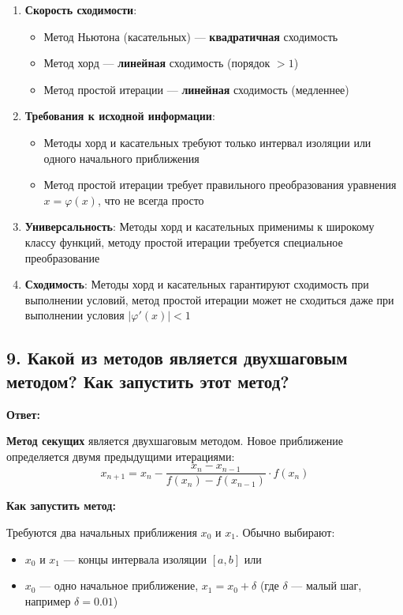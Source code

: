 \documentclass[a4paper,12pt]{article}
\begin{document}
\begin{enumerate}
    \item \textbf{Скорость сходимости}: 
    \begin{itemize}
        \item Метод Ньютона (касательных) --- \textbf{квадратичная} сходимость
        \item Метод хорд --- \textbf{линейная} сходимость (порядок $> 1$)
        \item Метод простой итерации --- \textbf{линейная} сходимость (медленнее)
    \end{itemize}
    
    \item \textbf{Требования к исходной информации}:
    \begin{itemize}
        \item Методы хорд и касательных требуют только интервал изоляции или одного начального приближения
        \item Метод простой итерации требует правильного преобразования уравнения $x = \varphi(x)$, что не всегда просто
    \end{itemize}
    
    \item \textbf{Универсальность}: Методы хорд и касательных применимы к широкому классу функций, методу простой итерации требуется специальное преобразование
    
    \item \textbf{Сходимость}: Методы хорд и касательных гарантируют сходимость при выполнении условий, метод простой итерации может не сходиться даже при выполнении условия $|\varphi'(x)| < 1$
\end{enumerate}

\subsection*{9. Какой из методов является двухшаговым методом? Как запустить этот метод?}

\textbf{Ответ:} 

\textbf{Метод секущих} является двухшаговым методом. Новое приближение определяется двумя предыдущими итерациями:
\[
    x_{n+1} = x_n - \frac{x_n - x_{n-1}}{f(x_n) - f(x_{n-1})} \cdot f(x_n)
\]

\textbf{Как запустить метод:}

Требуются два начальных приближения $x_0$ и $x_1$. Обычно выбирают:
\begin{itemize}
    \item $x_0$ и $x_1$ --- концы интервала изоляции $[a, b]$ или
    \item $x_0$ --- одно начальное приближение, $x_1 = x_0 + \delta$ (где $\delta$ --- малый шаг, например $\delta = 0.01$)
\end{itemize}
\end{document}
